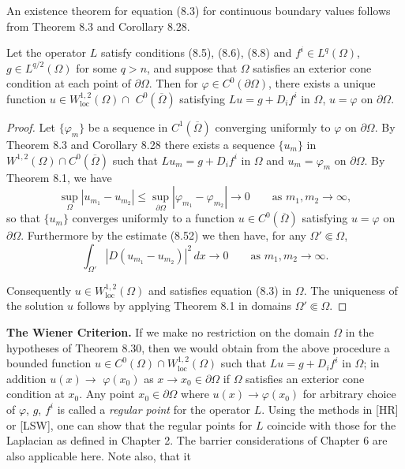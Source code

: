 An existence theorem for equation (8.3) for continuous boundary values follows
from Theorem 8.3 and Corollary 8.28.

\begin{theorem}[8.30]
Let the operator $L$ satisfy conditions (8.5), (8.6), (8.8) and $f^i \in L^q(\Omega)$,
$g \in L^{q/2}(\Omega)$ for some $q>n$, and suppose that $\Omega$ satisfies an exterior cone condition at
each point of $\partial\Omega$. Then for $\varphi \in C^0(\partial\Omega)$, there exists a unique function $u \in W^{1,2}_{\mathrm{loc}}(\Omega)\cap$
$C^0(\overline{\Omega})$ satisfying $Lu=g+D_i f^i$ in $\Omega$, $u=\varphi$ on $\partial\Omega$.
\end{theorem}

\begin{proof}
Let $\{\varphi_m\}$ be a sequence in $C^1(\overline{\Omega})$ converging uniformly to $\varphi$ on $\partial\Omega$. By
Theorem 8.3 and Corollary 8.28 there exists a sequence $\{u_m\}$ in $W^{1,2}(\Omega)\cap C^0(\overline{\Omega})$
such that $Lu_m=g+D_i f^i$ in $\Omega$ and $u_m=\varphi_m$ on $\partial\Omega$. By Theorem 8.1, we have
\[
\sup_{\Omega}|u_{m_1}-u_{m_2}|\le \sup_{\partial\Omega}|\varphi_{m_1}-\varphi_{m_2}| \to 0
\qquad \text{as } m_1,m_2 \to \infty,
\]
so that $\{u_m\}$ converges uniformly to a function $u \in C^0(\overline{\Omega})$ satisfying $u=\varphi$ on $\partial\Omega$.
Furthermore by the estimate (8.52) we then have, for any $\Omega' \Subset \Omega$,
\[
\int_{\Omega'} |D(u_{m_1}-u_{m_2})|^2\,dx \to 0 \qquad \text{as } m_1,m_2 \to \infty.
\]

Consequently $u \in W^{1,2}_{\mathrm{loc}}(\Omega)$ and satisfies equation (8.3) in $\Omega$. The uniqueness of the
solution $u$ follows by applying Theorem 8.1 in domains $\Omega' \Subset \Omega$. \square
\end{proof}

\medskip

\noindent \textbf{The Wiener Criterion.} If we make no restriction on the domain $\Omega$ in the hypotheses
of Theorem 8.30, then we would obtain from the above procedure a bounded
function $u \in C^0(\Omega)\cap W^{1,2}_{\mathrm{loc}}(\Omega)$ such that $Lu=g+D_i f^i$ in $\Omega$; in addition $u(x)\to$
$\varphi(x_0)$ as $x\to x_0 \in \partial\Omega$ if $\Omega$ satisfies an exterior cone condition at $x_0$. Any point
$x_0 \in \partial\Omega$ where $u(x)\to \varphi(x_0)$ for arbitrary choice of $\varphi$, $g$, $f^i$ is called a \textit{regular point}
for the operator $L$. Using the methods in [HR] or [LSW], one can show that the
regular points for $L$ coincide with those for the Laplacian as defined in Chapter 2.
The barrier considerations of Chapter 6 are also applicable here. Note also, that it


